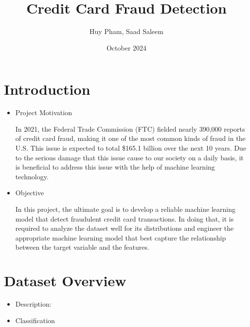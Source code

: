 \documentclass[12pt, letterpaper]{article}
\title{Credit Card Fraud Detection}
\author{Huy Pham, Saad Saleem}
\date{October 2024}
\begin{document}
\maketitle

\section{Introduction}
    \begin{itemize}
        \item Project Motivation
            \begin{description}
                In 2021, the Federal Trade Commission (FTC) fielded nearly 390,000 reports of credit card fraud, making it one of the most common kinds of fraud in the U.S.\cite{Bankrate} This issue is expected to total \$165.1 billion over the next 10 years. Due to the serious damage that this issue cause to our society on a daily basis, it is beneficial to address this issue with the help of machine learning technology.
            \end{description} 
        \item Objective
            \begin{description}
                In this project, the ultimate goal is to develop a reliable machine learning model that detect fraudulent credit card transactions. In doing that, it is required to analyze the dataset well for its distributions and engineer the appropriate machine learning model that best capture the relationship between the target variable and the features.                
            \end{description}
 
    \end{itemize}
\section{Dataset Overview}
    \begin{itemize}
        \item Description:
        \item Classification
    \end{itemize}
\end{document}
